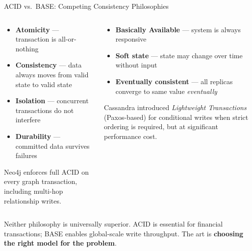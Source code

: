 \documentclass[aspectratio=169]{beamer}
\begin{document}
\begin{frame}{ACID vs.\ BASE: Competing Consistency Philosophies}
  \begin{columns}[T]
      \begin{tcolorbox}[neo4jbox, title=ACID (Neo4j)]
        \small
        \begin{itemize}
          \item \textbf{Atomicity} — transaction is all-or-nothing
          \item \textbf{Consistency} — data always moves from valid state to valid state
          \item \textbf{Isolation} — concurrent transactions do not interfere
          \item \textbf{Durability} — committed data survives failures
        \end{itemize}
        \vspace{0.2cm}
        \scriptsize Neo4j enforces full ACID on every graph transaction, including multi-hop relationship writes.
      \end{tcolorbox}
      \begin{tcolorbox}[cassbox, title=BASE (Cassandra)]
        \small
        \begin{itemize}
          \item \textbf{Basically Available} — system is always responsive
          \item \textbf{Soft state} — state may change over time without input
          \item \textbf{Eventually consistent} — all replicas converge to same value \textit{eventually}
        \end{itemize}
        \vspace{0.2cm}
        \scriptsize Cassandra introduced \textit{Lightweight Transactions} (Paxos-based) for conditional writes when strict ordering is required, but at significant performance cost.
      \end{tcolorbox}
  \end{columns}
  \vspace{0.4cm}
  \begin{tcolorbox}[infobox, title=Key Insight]
    \small
    Neither philosophy is universally superior. ACID is essential for financial transactions; BASE enables global-scale write throughput. The art is \textbf{choosing the right model for the problem}.
  \end{tcolorbox}
\end{frame}
\end{document}
